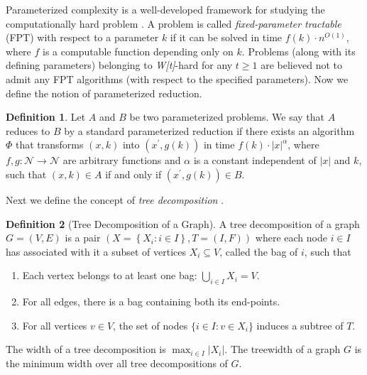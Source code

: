 \documentclass[a4paper,11pt]{article}
\theoremstyle{definition}
\newtheorem{definition}{Definition}
\begin{document}
\smallskip

Parameterized complexity is a well-developed framework for studying the computationally hard problem \cite{RGDMRF99,JFMG06,RN06}. A problem is called {\it fixed-parameter tractable} (FPT) with respect to a parameter $k$ if it can be solved in time $f(k)\cdot n^{O(1)}$, where $f$ is a computable function depending only on $k$. Problems (along with its defining parameters) belonging to {\it W[t]}-hard for any $t \ge 1$ are believed not to admit any FPT algorithms (with respect to the specified parameters). Now we define the notion of parameterized reduction.

\begin{definition}
Let $A$ and $B$ be two parameterized problems. We say that $A$ reduces to $B$ by a standard parameterized reduction if there exists an algorithm $\Phi$ that transforms $(x,k)$ into $(x^\prime, g(k))$ in time $f(k)\cdot \left|x\right|^\alpha$, where $f,g:\mathcal{N} \rightarrow \mathcal{N}$ are arbitrary functions and $\alpha$ is a constant independent of $\left|x\right|$ and $k$, such that $(x,k)\in A$ if and only if $(x^\prime,g(k)) \in B$.
\end{definition}

Next we define the concept of {\em tree decomposition} \cite{HLBAMCAK08,DBLP:books/sp/Kloks94}.

\begin{definition}[Tree Decomposition of a Graph]
A tree decomposition of a graph $G=(V,E)$ is a pair $(X=\left\{X_i:i\in I\right\}, T=(I,F))$ where each node $i\in I$ has associated with it a subset of vertices $X_i \subseteq V$, called the bag of $i$, such that
\begin{enumerate}
    \item{Each vertex belongs to at least one bag: $\bigcup_{i \in I}X_i = V$.}
    \item{For all edges, there is a bag containing both its end-points.}
    \item{For all vertices $v \in V$, the set of nodes $\{i \in I:v \in X_i\}$ induces a subtree of $T$.}
\end{enumerate}
\end{definition}

The width of a tree decomposition is $\max_{i \in I}\left|X_i\right|$. The treewidth of a graph $G$ is the minimum width over all tree decompositions of $G$.
\end{document}
